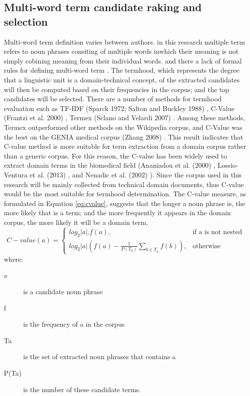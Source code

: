 \documentclass[Journal, InsideFigs, DoubleSpace]{ascelike} %
\begin{document}
\subsection{Multi-word term candidate raking and selection}
Multi-word term definition varies between authors. in this research multiple term refers to noun phrases consiting of multiple words inwhich their meaning is not simply cobining meaning from their individual words. and there a lack of formal rules for defining multi-word term \cite{frantzi20}. The termhood, which represents the degree that a linguistic unit is a domain-technical concept, of the extracted candidates will then be computed based on their frequencies in the corpus; and the top candidates will be selected. There are a number of methods for termhood evaluation such as TF-IDF (Sparck 1972; Salton and Buckley 1988) \cite{sparck72,salton88}, C-Value (Frantzi et al. 2000) \cite{frantzi20}, Termex (Sclano and Velardi 2007) \cite{sclano07}. Among these methods, Termex outperformed other methods on the Wikipedia corpus, and C-Value was the best on the GENIA medical corpus (Zhang 2008) \cite{zhang08}. This result indicates that C-value method is more suitable for term extraction from a domain corpus rather than a generic corpus. For this reason, the C-value has been widely used to extract domain terms in the biomedical field (Ananiadou et al. (2000) \cite{ananiadou20}, Lossio-Ventura et al. (2013) \cite{lossio13}, and Nenadic et al. (2002) \cite{nenadic02}). Since the corpus used in this research will be mainly collected from technical domain documents, thus C-value would be the most suitable for termhood determination. The C-value measure, as formulated in Equation \ref{eq:cvalue}, suggests that the longer a noun phrase is, the more likely that is a term; and the more frequently it appears in the domain corpus, the more likely it will be a domain term.
% 
\begin{equation}
C-value(a)=
\begin{cases}
log_2|a|.f(a), & \text{if a is not nested} \\
log_2|a|(f(a)-\frac{1}{P(T_a)}\sum_{b\in T_a} f(b)), & \text{otherwise}
\end{cases}
\label{eq:cvalue}
\end{equation}
%
where:
\begin{description}
	\item[a] is a candidate noun phrase
	\item[f] is the frequency of a in the corpus
	\item[Ta] is the set of extracted noun phrases that contains a
	\item[P(Ta)] is the number of these candidate terms.
\end{description}
\end{document}
